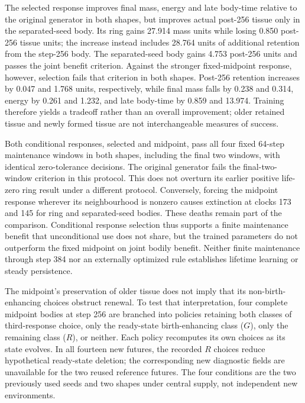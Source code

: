 The selected response improves final mass, energy and late body-time relative to the original generator in both shapes, but improves actual post-256 tissue only in the separated-seed body. Its ring gains 27.914 mass units while losing 0.850 post-256 tissue units; the increase instead includes 28.764 units of additional retention from the step-256 body. The separated-seed body gains 4.753 post-256 units and passes the joint benefit criterion. Against the stronger fixed-midpoint response, however, selection fails that criterion in both shapes. Post-256 retention increases by 0.047 and 1.768 units, respectively, while final mass falls by 0.238 and 0.314, energy by 0.261 and 1.232, and late body-time by 0.859 and 13.974. Training therefore yields a tradeoff rather than an overall improvement; older retained tissue and newly formed tissue are not interchangeable measures of success.

Both conditional responses, selected and midpoint, pass all four fixed 64-step maintenance windows in both shapes, including the final two windows, with identical zero-tolerance decisions. The original generator fails the final-two-window criterion in this protocol. This does not overturn its earlier positive life-zero ring result under a different protocol. Conversely, forcing the midpoint response wherever its neighbourhood is nonzero causes extinction at clocks 173 and 145 for ring and separated-seed bodies. These deaths remain part of the comparison. Conditional response selection thus supports a finite maintenance benefit that unconditional use does not share, but the trained parameters do not outperform the fixed midpoint on joint bodily benefit. Neither finite maintenance through step 384 nor an externally optimized rule establishes lifetime learning or steady persistence.

The midpoint's preservation of older tissue does not imply that its non-birth-enhancing choices obstruct renewal. To test that interpretation, four complete midpoint bodies at step 256 are branched into policies retaining both classes of third-response choice, only the ready-state birth-enhancing class ($G$), only the remaining class ($R$), or neither. Each policy recomputes its own choices as its state evolves. In all fourteen new futures, the recorded $R$ choices reduce hypothetical ready-state deletion; the corresponding new diagnostic fields are unavailable for the two reused reference futures. The four conditions are the two previously used seeds and two shapes under central supply, not independent new environments.

